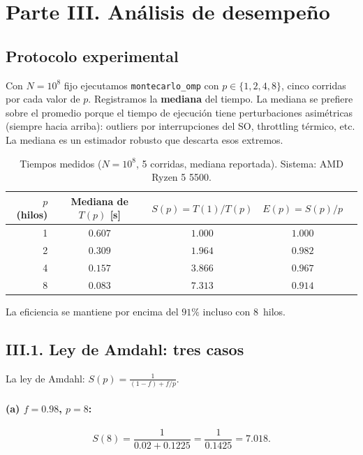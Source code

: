 \documentclass[12pt,a4paper]{article}
\begin{document}
\section{Parte III. An\'alisis de desempe\~no}

\subsection{Protocolo experimental}

Con $N=10^8$ fijo ejecutamos \texttt{montecarlo\_omp} con $p\in\{1,2,4,8\}$, cinco corridas por cada valor de $p$. Registramos la \textbf{mediana} del tiempo. La mediana se prefiere sobre el promedio porque el tiempo de ejecuci\'on tiene perturbaciones asim\'etricas (siempre hacia arriba): outliers por interrupciones del SO, throttling t\'ermico, etc. La mediana es un estimador robusto que descarta esos extremos.

\begin{table}[ht]
  \centering
  \caption{Tiempos medidos ($N=10^8$, 5 corridas, mediana reportada). Sistema: AMD Ryzen 5 5500.}
  \label{tab:speedup}
  \begin{tabular}{rcccc}
    \toprule
    $p$ (hilos) & Mediana de $T(p)$ [s] & $S(p)=T(1)/T(p)$ & $E(p)=S(p)/p$ \\
    \midrule
    1 & $0.607$ & $1.000$ & $1.000$ \\
    2 & $0.309$ & $1.964$ & $0.982$ \\
    4 & $0.157$ & $3.866$ & $0.967$ \\
    8 & $0.083$ & $7.313$ & $0.914$ \\
    \bottomrule
  \end{tabular}
\end{table}

La eficiencia se mantiene por encima del $91\%$ incluso con 8~hilos.

\subsection{III.1. Ley de Amdahl: tres casos}

La ley de Amdahl: $S(p) = \frac{1}{(1-f) + f/p}$.

\paragraph{\texorpdfstring{(a) $f=0.98$, $p=8$}{(a) f=0.98, p=8}:}
\[
S(8) = \frac{1}{0.02 + 0.1225} = \frac{1}{0.1425} = 7.018.
\]
\end{document}
